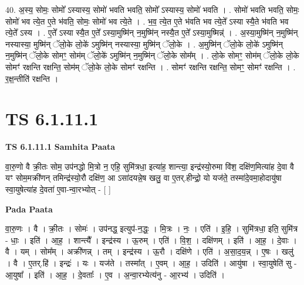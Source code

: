 \documentclass[17pt]{extarticle}
\begin{document}
40. अ॒स्य॒ सोमः॒ सोमो᳚ ऽस्यास्य॒ सोमो॑ भवति भवति॒ सोमो᳚ ऽस्यास्य॒ सोमो॑ भवति । . सोमो॑ भवति भवति॒ सोमः॒ सोमो॑ भव त्ये॒त ए॒ते भ॑वति॒ सोमः॒ सोमो॑ भव त्ये॒ते । . भ॒व॒ त्ये॒त ए॒ते भ॑वति भव त्ये॒ते᳚ ऽस्या स्यै॒ते भ॑वति भव त्ये॒ते᳚ ऽस्य । . ए॒ते᳚ ऽस्या स्यै॒त ए॒ते᳚ ऽस्या॒मुष्मि॑न् न॒मुष्मि॑न् नस्यै॒त ए॒ते᳚ ऽस्या॒मुष्मिन्न्॑ । . अ॒स्या॒मुष्मि॑न् न॒मुष्मि॑न् नस्यास्या॒ मुष्मि॑न् ॅलो॒के लो॒के॑ ऽमुष्मि॑न् नस्यास्या॒ मुष्मि॑न् ॅलो॒के । . अ॒मुष्मि॑न् ॅलो॒के लो॒के॑ ऽमुष्मि॑न् न॒मुष्मि॑न् ॅलो॒के सोमꣳ॒॒ सोम॑म् ॅलो॒के॑ ऽमुष्मि॑न् न॒मुष्मि॑न् ॅलो॒के सोम᳚म् । . लो॒के सोमꣳ॒॒ सोम॑म् ॅलो॒के लो॒के सोमꣳ॑ रक्षन्ति रक्षन्ति॒ सोम॑म् ॅलो॒के लो॒के सोमꣳ॑ रक्षन्ति । . सोमꣳ॑ रक्षन्ति रक्षन्ति॒ सोमꣳ॒॒ सोमꣳ॑ रक्षन्ति । . र॒क्ष॒न्तीति॑ रक्षन्ति । \newline
\pagebreak
{}

\section{ TS 6.1.11.1 }

\textbf{TS 6.1.11.1 } \newline
\textbf{Samhita Paata} \newline

वा॒रु॒णो वै क्री॒तः सोम॒ उप॑नद्धो मि॒त्रो न॒ एहि॒ सुमि॑त्रधा॒ इत्या॑ह॒ शान्त्या॒ इन्द्र॑स्यो॒रुमा वि॑श॒ दक्षि॑ण॒मित्या॑ह दे॒वा वै यꣳ सोम॒मक्री॑णन् तमिन्द्र॑स्यो॒रौ दक्षि॑ण॒ आ ऽसा॑दयन्ने॒ष खलु॒ वा ए॒तर्.हीन्द्रो॒ यो यज॑ते॒ तस्मा॑दे॒वमा॒होदायु॑षा स्वा॒युषेत्या॑ह दे॒वता॑ ए॒वा-न्वा॒रभ्योत् - [  ] \newline

\textbf{Pada Paata} \newline

वा॒रु॒णः । वै । क्री॒तः । सोमः॑ । उप॑नद्ध॒ इत्युप॑-न॒द्धः॒ । मि॒त्रः । नः॒ । एति॑ । इ॒हि॒ । सुमि॑त्रधा॒ इति॒ सुमि॑त्र - धाः॒ । इति॑ । आ॒ह॒ । शान्त्यै᳚ । इन्द्र॑स्य । ऊ॒रुम् । एति॑ । वि॒श॒ । दक्षि॑णम् । इति॑ । आ॒ह॒ । दे॒वाः । वै । यम् । सोम᳚म् । अक्री॑णन्न् । तम् । इन्द्र॑स्य । ऊ॒रौ । दक्षि॑णे । एति॑ । अ॒सा॒द॒य॒न्न् । ए॒षः । खलु॑ । वै । ए॒तर्.हि॑ । इन्द्रः॑ । यः । यज॑ते । तस्मा᳚त् । ए॒वम् । आ॒ह॒ । उदिति॑ । आयु॑षा । स्वा॒युषेति॑ सु - आ॒युषा᳚ । इति॑ । आ॒ह॒ । दे॒वताः᳚ । ए॒व । अ॒न्वा॒रभ्येत्य॑नु - आ॒रभ्य॑ । उदिति॑ ।  \newline
\end{document}
